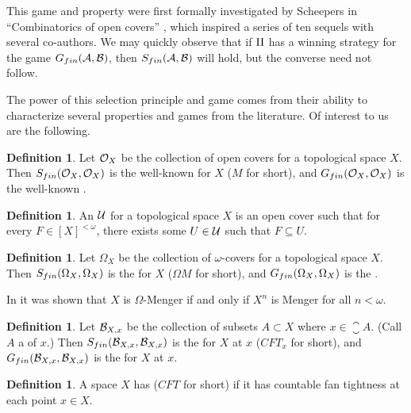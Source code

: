 \documentclass{amsart}
\theoremstyle{plain}
\theoremstyle{definition}
\newtheorem{definition}[theorem]{Definition}
\theoremstyle{remark}
\theoremstyle{plain}
\theoremstyle{definition}
\theoremstyle{remark}
\begin{document}
This game and property were first formally investigated
by Scheepers in ``Combinatorics of open covers'' \cite{MR1378387}, which
inspired a series of ten sequels with several co-authors. We may quickly
observe that if \(\mathrm{II}\) has a winning strategy for the game
\(G_{fin}(\mathcal{A},\mathcal{B})\), then \(S_{fin}(\mathcal{A},\mathcal{B})\) will hold,
but the converse need not follow.

The power of this selection principle and game comes from their ability
to characterize several properties and games from the literature.
Of interest to us are the following.

\begin{definition}
  Let \(\mathcal{O}_X\) be the collection of open covers for a topological space
  \(X\). Then \(S_{fin}(\mathcal{O}_X,\mathcal{O}_X)\) is the well-known
   for \(X\) (\(M\) for short), and
  \(G_{fin}(\mathcal{O}_X,\mathcal{O}_X)\) is the
  well-known .
\end{definition}

\begin{definition}
  An  \(\mathcal{U}\)
  for a topological space \(X\) is an open cover
  such that for every \(F\in[X]^{<\omega}\), there exists some \(U\in\mathcal{U}\)
  such that \(F\subseteq U\).
\end{definition}

\begin{definition}
  Let \(\Omega_X\) be the collection of \(\omega\)-covers for a topological
  space \(X\). Then \(S_{fin}(\Omega_X,\Omega_X)\) is the
   for \(X\) (\(\Omega M\) for short), and
  \(G_{fin}(\Omega_X,\Omega_X)\) is the .
\end{definition}

In \cite[Theorem 3.9]{MR1419798} it was shown that \(X\) is \(\Omega\)-Menger
if and only if \(X^n\) is Menger for all \(n<\omega\).

\begin{definition}
  Let \(\mathcal{B}_{X,x}\) be the collection of subsets \(A\subset X\) where
  \(x\in\closure{A}\). (Call \(A\) a  of \(x\).)
  Then \(S_{fin}(\mathcal{B}_{X,x},\mathcal{B}_{X,x})\) is the
   for \(X\) at \(x\)
  (\(CFT_x\) for short), and
  \(G_{fin}(\mathcal{B}_{X,x},\mathcal{B}_{X,x})\) is the
   for \(X\) at \(x\).
\end{definition}

\begin{definition}
  A space \(X\) has  (\(CFT\) for short)
  if it has
  countable fan tightness at each point \(x\in X\).
\end{definition}
\end{document}
